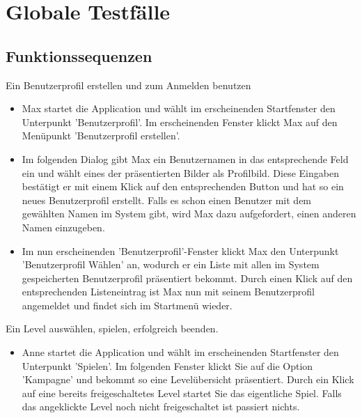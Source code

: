 \section{Globale Testfälle}

\subsection{Funktionssequenzen}

\begin{requirements}

	 Ein Benutzerprofil erstellen und zum Anmelden benutzen
	
	\begin{itemize}
	
  			\item Max startet die Application und wählt im erscheinenden Startfenster den Unterpunkt 'Benutzerprofil'. Im erscheinenden Fenster klickt Max auf den Menüpunkt 'Benutzerprofil erstellen'.
  			
  			\item Im folgenden Dialog gibt Max ein Benutzernamen in das entsprechende Feld ein und wählt eines der präsentierten Bilder als Profilbild. Diese Eingaben bestätigt er mit einem Klick auf den entsprechenden Button und hat so ein neues Benutzerprofil erstellt. Falls es schon einen Benutzer mit dem gewählten Namen im System gibt, wird Max dazu aufgefordert, einen anderen Namen einzugeben.
  			
  			\item Im nun erscheinenden 'Benutzerprofil'-Fenster klickt Max den Unterpunkt 'Benutzerprofil Wählen' an, wodurch er ein Liste mit allen im System gespeicherten Benutzerprofil präsentiert bekommt. Durch einen Klick auf den entsprechenden Listeneintrag ist Max nun mit seinem Benutzerprofil angemeldet und findet sich im Startmenü wieder.
  			
	\end{itemize}

  	
  	 Ein Level auswählen, spielen, erfolgreich beenden.
  	
  	\begin{itemize}
  	
  			\item Anne startet die Application und wählt im erscheinenden Startfenster den Unterpunkt 'Spielen'. Im folgenden Fenster klickt Sie auf die Option 'Kampagne' und bekommt so eine Levelübersicht präsentiert. Durch ein Klick auf eine bereits freigeschaltetes Level startet Sie das eigentliche Spiel. Falls das angeklickte Level noch nicht freigeschaltet ist passiert nichts.
  			

\end{itemize}
\end{requirements}
